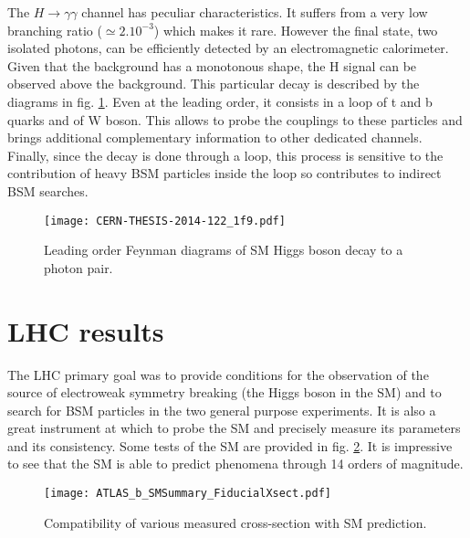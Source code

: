 \begin{enumerate}
The \(H\rightarrow \gamma\gamma\) channel has peculiar characteristics.
It suffers from a very low branching ratio (\(\simeq 2.10^{-3}\)) which makes it rare.
However the final state, two isolated photons, can be efficiently detected by an electromagnetic calorimeter.
Given that the background has a monotonous shape, the H signal can be observed above the background.
This particular decay is described by the diagrams in fig. \ref{fig:org310104c}.
Even at the leading order, it consists in a loop of t and b quarks and of W boson.
This allows to probe the couplings to these particles and brings additional complementary information to other dedicated channels.
Finally, since the decay is done through a loop, this process is sensitive to the contribution of heavy BSM particles inside the loop so contributes to indirect BSM searches.

\begin{figure}[htbp]
\centering
\texttt{[image: CERN-THESIS-2014-122\_1f9.pdf]}
\caption{\label{fig:org310104c}
Leading order Feynman diagrams of SM Higgs boson decay to a photon pair. \cite{CERN-THESIS-2014-122}}
\end{figure}
\end{enumerate}


\section{LHC results}
\label{sec:orgf76e3ba}

The LHC primary goal was to provide conditions for the observation of the source of electroweak symmetry breaking (the Higgs boson in the SM) and to search for BSM particles in the two general purpose experiments.
It is also a great instrument at which to probe the SM and precisely measure its parameters and its consistency.
Some tests of the SM are provided in fig. \ref{fig:org87b5838}.
It is impressive to see that the SM is able to predict phenomena through 14 orders of magnitude.


\begin{figure}[htbp]
\centering
\texttt{[image: ATLAS\_b\_SMSummary\_FiducialXsect.pdf]}
\caption{\label{fig:org87b5838}
Compatibility of various measured cross-section with SM prediction. \cite{ATLASSMTest}}
\end{figure}


